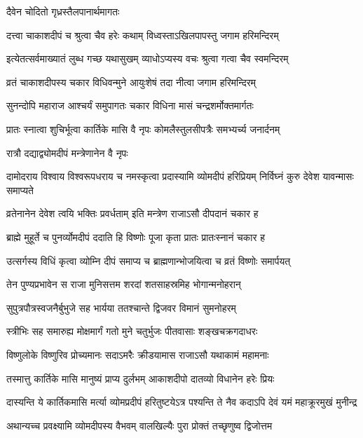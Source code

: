 \onelineshloka
{दैवेन चोदितो गृध्रस्तैलपानार्थमागतः} %

\twolineshloka
{दत्त्वा चाकाशदीपं च श्रुत्वा चैव हरेः कथाम्}
{विध्वस्ताऽखिलपापस्तु जगाम हरिमन्दिरम्} %

\twolineshloka
{इत्येतत्सर्वमाख्यातं लुब्ध गच्छ यथासुखम्}
{व्याधोऽप्यस्य वचः श्रुत्वा गत्वा चैव स्वमन्दिरम्} %

\twolineshloka
{व्रतं चाकाशदीपस्य चकार विधिवन्मुने}
{आयुःशेषं तदा नीत्वा जगाम हरिमन्दिरम्} %

\twolineshloka
{सुनन्दोपि महाराज आश्चर्यं समुपागतः}
{चकार विधिना मासं चन्द्रशर्मोक्तमार्गतः} %

\twolineshloka
{प्रातः स्नात्वा शुचिर्भूत्वा कार्तिके मासि वै नृपः}
{कोमलैस्तुलसीपत्रैः समभ्यर्च्य जनार्दनम्} %


\onelineshloka
{रात्रौ दद्याद्व्योमदीपं मन्त्रेणानेन वै नृपः} %

\threelineshloka
{दामोदराय विश्वाय विश्वरूपधराय च}
{नमस्कृत्वा प्रदास्यामि व्योमदीपं हरिप्रियम्}
{निर्विघ्नं कुरु देवेश यावन्मासः समाप्यते} %

\twolineshloka
{व्रतेनानेन देवेश त्वयि भक्तिः प्रवर्धताम्}
{इति मन्त्रेण राजाऽसौ दीपदानं चकार ह} %

\twolineshloka
{ब्राह्मे मुहूर्ते च पुनर्व्योमदीपं ददाति हि}
{विष्णोः पूजा कृता प्रातः प्रातःस्नानं चकार ह} %

\twolineshloka
{उत्सर्गस्य विधिं कृत्वा व्योम्नि दीपं समाप्य च}
{ब्राह्मणान्भोजयित्वा च व्रतं विष्णोः समार्पयत्} %

\twolineshloka
{तेन पुण्यप्रभावेन स राजा मुनिसत्तम}
{शरदां शतसाहस्रमिह भोगान्मनोहरान्} %

\twolineshloka
{सुपुत्रपौत्रस्वजनैर्बुभुजे सह भार्यया}
{ततश्चान्ते द्विजवर विमानं सुमनोहरम्} %

\twolineshloka
{स्त्रीभिः सह समारुह्य मोक्षमार्गं गतो मुने}
{चतुर्भुजः पीतवासाः शङ्खचक्रगदाधरः} %

\twolineshloka
{विष्णुलोके विष्णुरिव प्रोच्यमानः सदाऽमरैः}
{क्रीडयामास राजाऽसौ यथाकामं महामनाः} %

\twolineshloka
{तस्मात्तु कार्तिके मासि मानुष्यं प्राप्य दुर्लभम्}
{आकाशदीपो दातव्यो विधानेन हरेः प्रियः} %

\fourlineindentedshloka
{दास्यन्ति ये कार्तिकमासि मर्त्या}
{व्योमप्रदीपं हरितुष्टयेऽत्र}
{पश्यन्ति ते नैव कदाऽपि देवं}
{यमं महाक्रूरमुखं मुनीन्द्र} %

\twolineshloka
{अथान्यच्च प्रवक्ष्यामि व्योमदीपस्य वैभवम्}
{वालखिल्यैः पुरा प्रोक्तं तच्छृणुष्व द्विजोत्तम} %


